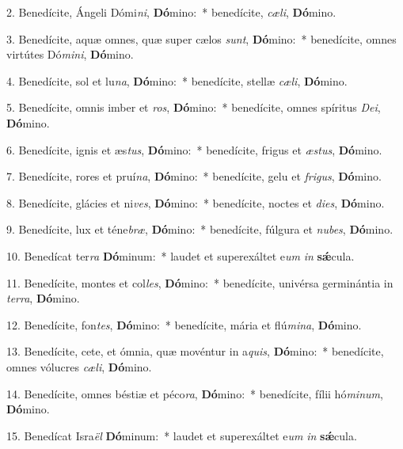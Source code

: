 
2. Benedícite, Ángeli Dómi\textit{ni}, \textbf{Dó}mino:~* benedícite, \textit{cæ}\textit{li}, \textbf{Dó}mino.

3. Benedícite, aquæ omnes, quæ super cælos \textit{sunt}, \textbf{Dó}mino:~* benedícite, omnes virtútes Dó\textit{mi}\textit{ni}, \textbf{Dó}mino.

4. Benedícite, sol et lu\textit{na}, \textbf{Dó}mino:~* benedícite, stellæ \textit{cæ}\textit{li}, \textbf{Dó}mino.

5. Benedícite, omnis imber et \textit{ros}, \textbf{Dó}mino:~* benedícite, omnes spíritus \textit{De}\textit{i}, \textbf{Dó}mino.

6. Benedícite, ignis et æs\textit{tus}, \textbf{Dó}mino:~* benedícite, frigus et \textit{æs}\textit{tus}, \textbf{Dó}mino.

7. Benedícite, rores et pruí\textit{na}, \textbf{Dó}mino:~* benedícite, gelu et \textit{fri}\textit{gus}, \textbf{Dó}mino.

8. Benedícite, glácies et ni\textit{ves}, \textbf{Dó}mino:~* benedícite, noctes et \textit{di}\textit{es}, \textbf{Dó}mino.

9. Benedícite, lux et téne\textit{bræ}, \textbf{Dó}mino:~* benedícite, fúlgura et \textit{nu}\textit{bes}, \textbf{Dó}mino.

10. Benedícat ter\textit{ra} \textbf{Dó}minum:~* laudet et superexáltet e\textit{um} \textit{in} \textbf{s\'{\ae}}cula.

11. Benedícite, montes et col\textit{les}, \textbf{Dó}mino:~* benedícite, univérsa germinántia in \textit{ter}\textit{ra}, \textbf{Dó}mino.

12. Benedícite, fon\textit{tes}, \textbf{Dó}mino:~* benedícite, mária et flú\textit{mi}\textit{na}, \textbf{Dó}mino.

13. Benedícite, cete, et ómnia, quæ movéntur in a\textit{quis}, \textbf{Dó}mino:~* benedícite, omnes vólucres \textit{cæ}\textit{li}, \textbf{Dó}mino.

14. Benedícite, omnes béstiæ et péco\textit{ra}, \textbf{Dó}mino:~* benedícite, fílii hó\textit{mi}\textit{num}, \textbf{Dó}mino.

15. Benedícat Isra\textit{ël} \textbf{Dó}minum:~* laudet et superexáltet e\textit{um} \textit{in} \textbf{s\'{\ae}}cula.

